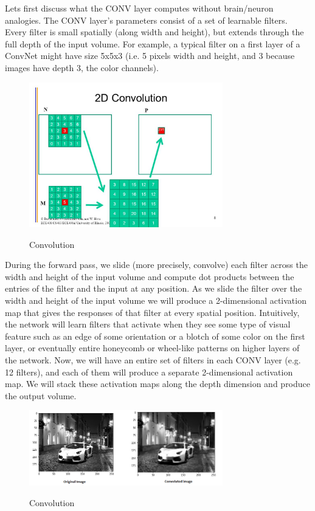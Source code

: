 \documentclass[12pt]{article}
\begin{document}
		 Lets first discuss what the CONV layer computes without brain/neuron analogies. The CONV layer’s parameters consist of a set of learnable filters. Every filter is small spatially (along width and height), but extends through the full depth of the input volume. For example, a typical filter on a first layer of a ConvNet might have size 5x5x3 (i.e. 5 pixels width and height, and 3 because images have depth 3, the color channels).
\begin{figure}[h]
    	\centering
    	\includegraphics[width=0.75\textwidth]{2d.jpg}
       	\label{fig:mesh10}
	\caption{Convolution}
	\end{figure}

		 
		  During the forward pass, we slide (more precisely, convolve) each filter across the width and height of the input volume and compute dot products between the entries of the filter and the input at any position. As we slide the filter over the width and height of the input volume we will produce a 2-dimensional activation map that gives the responses of that filter at every spatial position. Intuitively, the network will learn filters that activate when they see some type of visual feature such as an edge of some orientation or a blotch of some color on the first layer, or eventually entire honeycomb or wheel-like patterns on higher layers of the network. Now, we will have an entire set of filters in each CONV layer (e.g. 12 filters), and each of them will produce a separate 2-dimensional activation map. We will stack these activation maps along the depth dimension and produce the output volume.
		         
        
        \begin{figure}[h]
    	\centering
    	\includegraphics[width=0.75\textwidth]{convimages.png}
       	\label{fig:mesh11}
	\caption{Convolution}
	\end{figure} 
	
\end{document}
